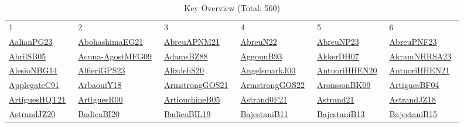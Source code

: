 \begin{longtable}{*{6}{l}}
\rowcolor{white}\caption{Key Overview (Total: 560)}\\ \toprule
\rowcolor{white}1 & 2 & 3 & 4 & 5 & 6\\ \midrule
\endhead
\bottomrule
\endfoot
\href{works/AalianPG23.pdf}{AalianPG23}~\cite{AalianPG23} & \href{works/AbohashimaEG21.pdf}{AbohashimaEG21}~\cite{AbohashimaEG21} & \href{works/AbreuAPNM21.pdf}{AbreuAPNM21}~\cite{AbreuAPNM21} & \href{works/AbreuN22.pdf}{AbreuN22}~\cite{AbreuN22} & \href{works/AbreuNP23.pdf}{AbreuNP23}~\cite{AbreuNP23} & \href{}{AbreuPNF23}~\cite{AbreuPNF23}\\ 
\href{works/AbrilSB05.pdf}{AbrilSB05}~\cite{AbrilSB05} & \href{works/Acuna-AgostMFG09.pdf}{Acuna-AgostMFG09}~\cite{Acuna-AgostMFG09} & \href{}{AdamsBZ88}~\cite{AdamsBZ88} & \href{works/AggounB93.pdf}{AggounB93}~\cite{AggounB93} & \href{works/AkkerDH07.pdf}{AkkerDH07}~\cite{AkkerDH07} & \href{works/AkramNHRSA23.pdf}{AkramNHRSA23}~\cite{AkramNHRSA23}\\ 
\href{works/AlesioNBG14.pdf}{AlesioNBG14}~\cite{AlesioNBG14} & \href{works/AlfieriGPS23.pdf}{AlfieriGPS23}~\cite{AlfieriGPS23} & \href{}{AlizdehS20}~\cite{AlizdehS20} & \href{works/AngelsmarkJ00.pdf}{AngelsmarkJ00}~\cite{AngelsmarkJ00} & \href{works/AntuoriHHEN20.pdf}{AntuoriHHEN20}~\cite{AntuoriHHEN20} & \href{works/AntuoriHHEN21.pdf}{AntuoriHHEN21}~\cite{AntuoriHHEN21}\\ 
\href{}{ApplegateC91}~\cite{ApplegateC91} & \href{works/ArbaouiY18.pdf}{ArbaouiY18}~\cite{ArbaouiY18} & \href{works/ArmstrongGOS21.pdf}{ArmstrongGOS21}~\cite{ArmstrongGOS21} & \href{works/ArmstrongGOS22.pdf}{ArmstrongGOS22}~\cite{ArmstrongGOS22} & \href{works/AronssonBK09.pdf}{AronssonBK09}~\cite{AronssonBK09} & \href{works/ArtiguesBF04.pdf}{ArtiguesBF04}~\cite{ArtiguesBF04}\\ 
\href{}{ArtiguesHQT21}~\cite{ArtiguesHQT21} & \href{works/ArtiguesR00.pdf}{ArtiguesR00}~\cite{ArtiguesR00} & \href{works/ArtiouchineB05.pdf}{ArtiouchineB05}~\cite{ArtiouchineB05} & \href{works/Astrand0F21.pdf}{Astrand0F21}~\cite{Astrand0F21} & \href{works/Astrand21.pdf}{Astrand21}~\cite{Astrand21} & \href{works/AstrandJZ18.pdf}{AstrandJZ18}~\cite{AstrandJZ18}\\ 
\href{works/AstrandJZ20.pdf}{AstrandJZ20}~\cite{AstrandJZ20} & \href{works/BadicaBI20.pdf}{BadicaBI20}~\cite{BadicaBI20} & \href{works/BadicaBIL19.pdf}{BadicaBIL19}~\cite{BadicaBIL19} & \href{works/BajestaniB11.pdf}{BajestaniB11}~\cite{BajestaniB11} & \href{works/BajestaniB13.pdf}{BajestaniB13}~\cite{BajestaniB13} & \href{works/BajestaniB15.pdf}{BajestaniB15}~\cite{BajestaniB15}\\ 

\end{longtable}
